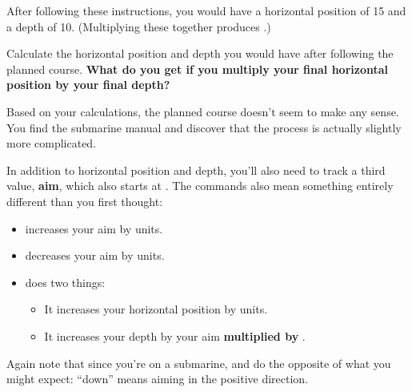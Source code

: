 After following these instructions, you would have a horizontal position of 15 and a depth of 10. (Multiplying these together produces .)

Calculate the horizontal position and depth you would have after following the planned course. \textbf{What do you get if you multiply your final horizontal position by your final depth?}


Based on your calculations, the planned course doesn't seem to make any sense. You find the submarine manual and discover that the process is actually slightly more complicated.

In addition to horizontal position and depth, you'll also need to track a third value, \textbf{aim}, which also starts at . The commands also mean something entirely different than you first thought:

\begin{itemize}
\item {\Tt{}\nwendquote} increases your aim by  units.
\item {\Tt{}\nwendquote} decreases your aim by  units.
\item {\Tt{}\nwendquote} does two things:
  \begin{itemize}
  \item It increases your horizontal position by  units.
  \item It increases your depth by your aim \textbf{multiplied by} .
  \end{itemize}
\end{itemize}

Again note that since you're on a submarine, {\Tt{}\nwendquote} and {\Tt{}\nwendquote} do the opposite of what you might expect: ``down'' means aiming in the positive direction.

